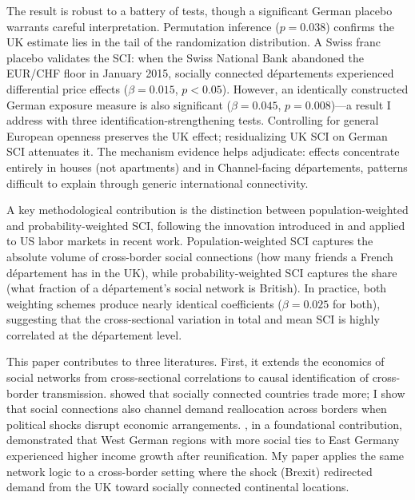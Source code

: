 \documentclass[12pt]{article}
\begin{document}
The result is robust to a battery of tests, though a significant German placebo warrants careful interpretation. Permutation inference ($p = 0.038$) confirms the UK estimate lies in the tail of the randomization distribution. A Swiss franc placebo validates the SCI: when the Swiss National Bank abandoned the EUR/CHF floor in January 2015, socially connected d\'epartements experienced differential price effects ($\beta = 0.015$, $p < 0.05$). However, an identically constructed German exposure measure is also significant ($\beta = 0.045$, $p = 0.008$)---a result I address with three identification-strengthening tests. Controlling for general European openness preserves the UK effect; residualizing UK SCI on German SCI attenuates it. The mechanism evidence helps adjudicate: effects concentrate entirely in houses (not apartments) and in Channel-facing d\'epartements, patterns difficult to explain through generic international connectivity.

A key methodological contribution is the distinction between population-weighted and probability-weighted SCI, following the innovation introduced in \citet{bailey2018social} and applied to US labor markets in recent work. Population-weighted SCI captures the absolute volume of cross-border social connections (how many friends a French d\'epartement has in the UK), while probability-weighted SCI captures the share (what fraction of a d\'epartement's social network is British). In practice, both weighting schemes produce nearly identical coefficients ($\beta = 0.025$ for both), suggesting that the cross-sectional variation in total and mean SCI is highly correlated at the d\'epartement level.

This paper contributes to three literatures. First, it extends the economics of social networks \citep{rauch2001business, chaney2014network, bailey2018social} from cross-sectional correlations to causal identification of cross-border transmission. \citet{bailey2021international} showed that socially connected countries trade more; I show that social connections also channel demand reallocation across borders when political shocks disrupt economic arrangements. \citet{burchardi2013economic}, in a foundational contribution, demonstrated that West German regions with more social ties to East Germany experienced higher income growth after reunification. My paper applies the same network logic to a cross-border setting where the shock (Brexit) redirected demand from the UK toward socially connected continental locations.
\end{document}
